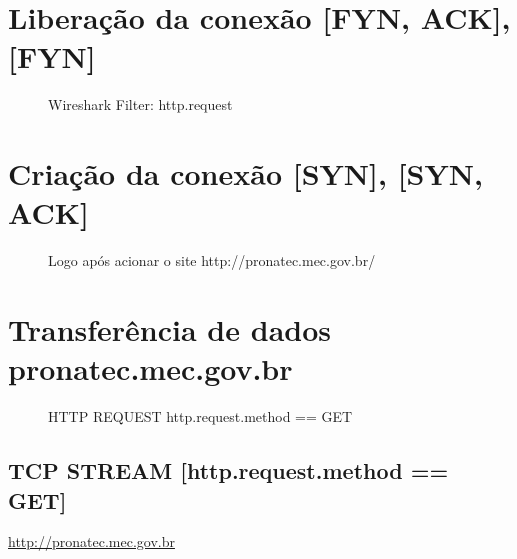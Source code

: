 \documentclass[13pt, a4paper]{article}
\begin{document}
\pagebreak
\section{Liberação da conexão [FYN, ACK], [FYN]}
\begin{center}
\begin{figure}[ht]
\caption{Wireshark Filter: http.request}
\end{figure}
\end{center}

\pagebreak
\section{Criação da conexão [SYN], [SYN, ACK]}
\begin{center}
\begin{figure}[ht]
\caption{Logo após acionar o site http://pronatec.mec.gov.br/}
\end{figure}
\end{center}

\pagebreak
\section{Transferência de dados pronatec.mec.gov.br}
\begin{center}
\begin{figure}[ht]
\caption{HTTP REQUEST http.request.method == GET}
\end{figure}
\end{center}

\pagebreak
\subsection{TCP STREAM [http.request.method == GET]}

\begin{huge}
   \href{Pronatec.mec.gov}{http://pronatec.mec.gov.br}
\end{huge}
\end{document}
